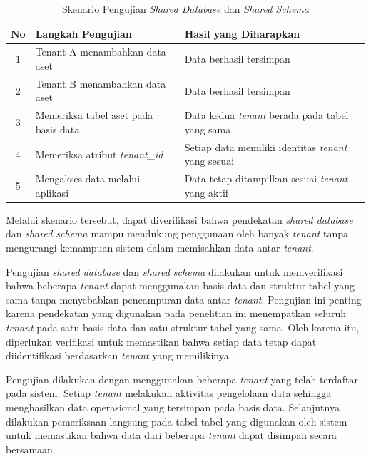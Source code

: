 \begin{table}[H]
  \centering
  \caption{Skenario Pengujian \textit{Shared Database} dan \textit{Shared Schema}}
  \label{tab:skenario_pengujian_shared_database}
  \footnotesize
  \begin{tabular}{|c|p{6cm}|p{6.5cm}|}
    \hline
    \rowcolor[HTML]{EFEFEF}
    \textbf{No} & \textbf{Langkah Pengujian} & \textbf{Hasil yang Diharapkan} \\
    \hline
    1 & Tenant A menambahkan data aset & Data berhasil tersimpan \\
    \hline
    2 & Tenant B menambahkan data aset & Data berhasil tersimpan \\
    \hline
    3 & Memeriksa tabel aset pada basis data & Data kedua \textit{tenant} berada pada tabel yang sama \\
    \hline
    4 & Memeriksa atribut \textit{tenant\_id} & Setiap data memiliki identitas \textit{tenant} yang sesuai \\
    \hline
    5 & Mengakses data melalui aplikasi & Data tetap ditampilkan sesuai \textit{tenant} yang aktif \\
    \hline
  \end{tabular}
\end{table}

Melalui skenario tersebut, dapat diverifikasi bahwa pendekatan \textit{shared database} dan \textit{shared schema} mampu mendukung penggunaan oleh banyak \textit{tenant} tanpa mengurangi kemampuan sistem dalam memisahkan data antar \textit{tenant}.

Pengujian \textit{shared database} dan \textit{shared schema} dilakukan untuk memverifikasi bahwa beberapa \textit{tenant} dapat menggunakan basis data dan struktur tabel yang sama tanpa menyebabkan pencampuran data antar \textit{tenant}. Pengujian ini penting karena pendekatan yang digunakan pada penelitian ini menempatkan seluruh \textit{tenant} pada satu basis data dan satu struktur tabel yang sama. Oleh karena itu, diperlukan verifikasi untuk memastikan bahwa setiap data tetap dapat diidentifikasi berdasarkan \textit{tenant} yang memilikinya.

Pengujian dilakukan dengan menggunakan beberapa \textit{tenant} yang telah terdaftar pada sistem. Setiap \textit{tenant} melakukan aktivitas pengelolaan data sehingga menghasilkan data operasional yang tersimpan pada basis data. Selanjutnya dilakukan pemeriksaan langsung pada tabel-tabel yang digunakan oleh sistem untuk memastikan bahwa data dari beberapa \textit{tenant} dapat disimpan secara bersamaan.

